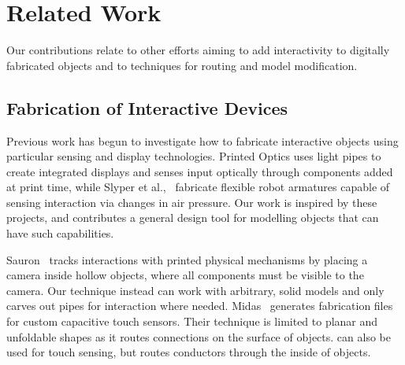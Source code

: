 \section{Related Work}
Our contributions relate to other efforts aiming to add interactivity to digitally fabricated objects and to techniques for routing and model modification.  

\subsection{Fabrication of Interactive Devices}

Previous work has begun to investigate how to fabricate interactive objects using particular sensing and display technologies. Printed Optics \cite{Willis-printedoptics} uses light pipes to create integrated displays and senses input optically through components added at print time, while Slyper et al.,~\cite{Slyper-pressure} fabricate flexible robot armatures capable of sensing interaction via changes in air pressure. Our work is inspired by these projects, and contributes a general design tool for modelling objects that can have such capabilities.  

Sauron~\cite{Savage-sauron} tracks interactions with printed physical mechanisms by placing a camera inside hollow objects, where all components must be visible to the camera.  Our technique instead can work with arbitrary, solid models and only carves out pipes for interaction where needed. Midas~\cite{Savage-midas} generates fabrication files for custom capacitive touch sensors.  Their technique is limited to planar and unfoldable shapes as it routes connections on the surface of objects. \systemname can also be used for touch sensing, but routes conductors through the inside of objects.



